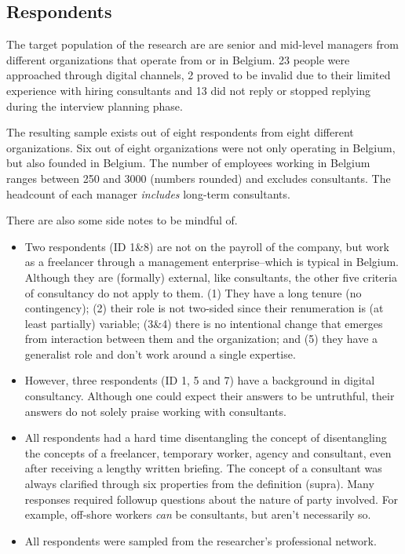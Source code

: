 \documentclass[12pt]{article}
\begin{document}
\subsection{Respondents}\label{respondents}

The target population of the research are are senior and mid-level
managers from different organizations that operate from or in Belgium.
23 people were approached through digital channels, 2 proved to be
invalid due to their limited experience with hiring consultants and 13
did not reply or stopped replying during the interview planning phase.

The resulting sample exists out of eight respondents from eight
different organizations. Six out of eight organizations were not only
operating in Belgium, but also founded in Belgium. The number of
employees working in Belgium ranges between 250 and 3000 (numbers
rounded) and excludes consultants. The headcount of each manager
\emph{includes} long-term consultants.

There are also some side notes to be mindful of.

\begin{itemize}
\item
  Two respondents (ID 1\&8) are not on the payroll of the company, but
  work as a freelancer through a management enterprise--which is typical
  in Belgium. Although they are (formally) external, like consultants,
  the other five criteria of consultancy do not apply to them. (1) They
  have a long tenure (no contingency); (2) their role is not two-sided
  since their renumeration is (at least partially) variable; (3\&4)
  there is no intentional change that emerges from interaction between
  them and the organization; and (5) they have a generalist role and
  don't work around a single expertise.
\item
  However, three respondents (ID 1, 5 and 7) have a background in
  digital consultancy. Although one could expect their answers to be
  untruthful, their answers do not solely praise working with
  consultants.
\item
  All respondents had a hard time disentangling the concept of
  disentangling the concepts of a freelancer, temporary worker, agency
  and consultant, even after receiving a lengthy written briefing. The
  concept of a consultant was always clarified through six properties
  from the definition (supra). Many responses required followup
  questions about the nature of party involved. For example, off-shore
  workers \emph{can} be consultants, but aren't necessarily so.
\item
  All respondents were sampled from the researcher's professional
  network.
\end{itemize}
\end{document}
